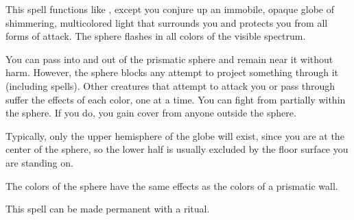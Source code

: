\begin{spelleffect}
  This spell functions like , except you conjure up an immobile, opaque globe of shimmering, multicolored light that surrounds you and protects you from all forms of attack. The sphere flashes in all colors of the visible spectrum. 
  \par You can pass into and out of the prismatic sphere and remain near it without harm. However, the sphere blocks any attempt to project something through it (including spells). Other creatures that attempt to attack you or pass through suffer the effects of each color, one at a time. You can fight from partially within the sphere. If you do, you gain cover from anyone outside the sphere.
  \par Typically, only the upper hemisphere of the globe will exist, since you are at the center of the sphere, so the lower half is usually excluded by the floor surface you are standing on.
  \par The colors of the sphere have the same effects as the colors of a prismatic wall.
\end{spelleffect}
\begin{spellnotes}
This spell can be made permanent with a  ritual.
\end{spellnotes}


